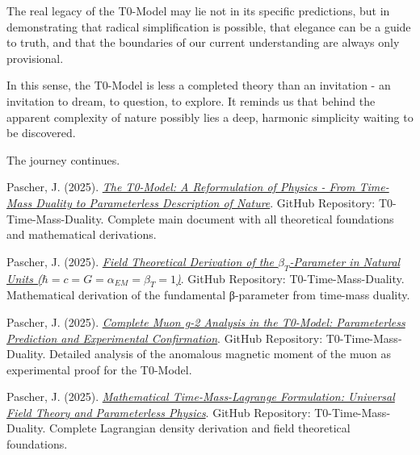 \documentclass[12pt,a4paper]{report}
\begin{document}
	The real legacy of the T0-Model may lie not in its specific predictions, but in demonstrating that radical simplification is possible, that elegance can be a guide to truth, and that the boundaries of our current understanding are always only provisional.
	
	In this sense, the T0-Model is less a completed theory than an invitation - an invitation to dream, to question, to explore. It reminds us that behind the apparent complexity of nature possibly lies a deep, harmonic simplicity waiting to be discovered.
	
	The journey continues.
	
	\begin{thebibliography}{50}
		
		Pascher, J. (2025). \href{https://github.com/jpascher/T0-Time-Mass-Duality/blob/main/2/pdf/T0_En_4.pdf}{\textit{The T0-Model: A Reformulation of Physics - From Time-Mass Duality to Parameterless Description of Nature}}. GitHub Repository: T0-Time-Mass-Duality. Complete main document with all theoretical foundations and mathematical derivations.
		
		Pascher, J. (2025). \href{https://github.com/jpascher/T0-Time-Mass-Duality/blob/main/2/pdf/DerivationOfBetaEn.pdf}{\textit{Field Theoretical Derivation of the $\beta_T$-Parameter in Natural Units ($\hbar = c = G = \alpha_{EM} = \beta_T = 1$)}}. GitHub Repository: T0-Time-Mass-Duality. Mathematical derivation of the fundamental β-parameter from time-mass duality.
		
		Pascher, J. (2025). \href{https://github.com/jpascher/T0-Time-Mass-Duality/blob/main/2/pdf/CompleteMuon_g-2_AnalysisEn.pdf}{\textit{Complete Muon g-2 Analysis in the T0-Model: Parameterless Prediction and Experimental Confirmation}}. GitHub Repository: T0-Time-Mass-Duality. Detailed analysis of the anomalous magnetic moment of the muon as experimental proof for the T0-Model.
		
		Pascher, J. (2025). \href{https://github.com/jpascher/T0-Time-Mass-Duality/blob/main/2/pdf/MathTimeMassLagrangeEn.pdf}{\textit{Mathematical Time-Mass-Lagrange Formulation: Universal Field Theory and Parameterless Physics}}. GitHub Repository: T0-Time-Mass-Duality. Complete Lagrangian density derivation and field theoretical foundations.
		

\end{thebibliography}
\end{document}
